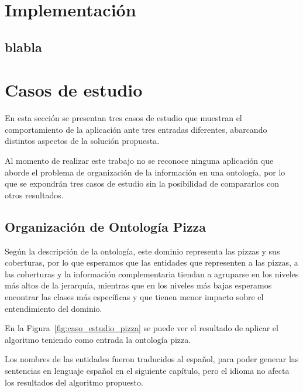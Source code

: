 \section{Implementación}
\subsection{blabla}

\section{Casos de estudio}
En esta sección se presentan tres casos de estudio que muestran el comportamiento de la aplicación ante tres entradas diferentes, abarcando distintos aspectos de la solución propuesta.

Al momento de realizar este trabajo no se reconoce ninguna aplicación que aborde el problema de organización de la información en una ontología, por lo que se expondrán tres casos de estudio sin la posibilidad de compararlos con otros resultados.

\subsection{Organización de Ontología Pizza}
Según la descripción de la ontología, este dominio representa las pizzas y sus coberturas, por lo que esperamos que las entidades que representen a las pizzas, a las coberturas y la información complementaria tiendan a agruparse en los niveles más altos de la jerarquía, mientras que en los niveles más bajas esperamos encontrar las clases más específicas y que tienen menor impacto sobre el entendimiento del dominio.

En la Figura~\ref{fig:caso_estudio_pizza} se puede ver el resultado de aplicar el algoritmo teniendo como entrada la ontología pizza. 

Los nombres de las entidades fueron traducidos al español, para poder generar las sentencias en lenguaje español en el siguiente capítulo, pero el idioma no afecta los resultados del algoritmo propuesto.

